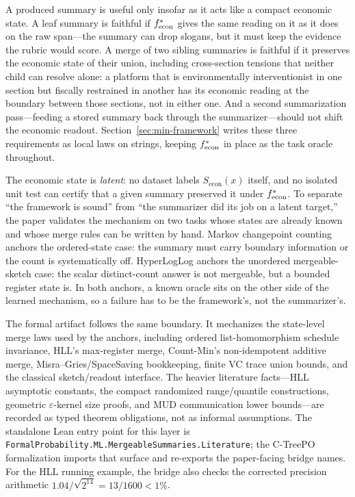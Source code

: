 A produced summary is useful only insofar as it acts like a compact
economic state. A leaf summary is faithful if $f^\ast_{\mathrm{econ}}$
gives the same reading on it as it does on the raw span---the summary
can drop slogans, but it must keep the evidence the rubric would score.
A merge of two sibling summaries is faithful if it preserves the economic
state of their union, including cross-section tensions that neither
child can resolve alone: a platform that is environmentally
interventionist in one section but fiscally restrained in another has
its economic reading at the boundary between those sections, not in
either one. And a second summarization pass---feeding a stored summary
back through the summarizer---should not shift the economic readout.
Section~\ref{sec:min-framework} writes these three requirements as local
laws on strings, keeping $f^\ast_{\mathrm{econ}}$ in place as the task
oracle throughout.

The economic state is \emph{latent}: no dataset labels $S_{\mathrm{econ}}(x)$
itself, and no isolated unit test can certify that a given summary preserved
it under $f^\ast_{\mathrm{econ}}$. To separate ``the framework is sound''
from ``the summarizer did its job on a latent target,'' the paper validates
the mechanism on two tasks whose states are already known and whose merge
rules can be written by hand. Markov changepoint counting anchors the
ordered-state case: the summary must carry boundary information or the count
is systematically off. HyperLogLog anchors the unordered mergeable-sketch
case: the scalar distinct-count answer is not mergeable, but a bounded register
state is. In both anchors, a known oracle sits on the other side of the learned
mechanism, so a failure has to be the framework's, not the summarizer's.

The formal artifact follows the same boundary. It mechanizes the state-level
merge laws used by the anchors, including ordered list-homomorphism schedule
invariance, HLL's max-register merge, Count-Min's non-idempotent additive merge,
Misra--Gries/SpaceSaving bookkeeping, finite VC trace union bounds, and the
classical sketch/readout interface. The heavier literature facts---HLL
asymptotic constants, the compact randomized range/quantile constructions,
geometric $\varepsilon$-kernel size proofs, and MUD communication lower
bounds---are recorded as typed theorem obligations, not as informal
assumptions. The standalone Lean
entry point for this layer is
\texttt{FormalProbability.ML.MergeableSummaries.Literature}; the C-TreePO
formalization imports that surface and re-exports the paper-facing bridge
names. For the HLL running example, the bridge also checks the corrected
precision arithmetic $1.04/\sqrt{2^{14}}=13/1600<1\%$.

